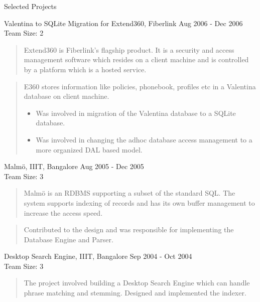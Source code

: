 \documentclass{resume}
\newcommand{\teamsize}{\\\sc\footnotesize Team Size: }
\begin{document}
\begin{category}{Selected Projects}{}
    \item {\topic Valentina to SQLite Migration for Extend360,} Fiberlink
        {\period Aug 2006 - Dec 2006}
        {\teamsize 2}
        \begin{quote}
            Extend360 is Fiberlink's flagship product. It is a security and
            access management software which resides on a client machine and is
            controlled by a platform which is a hosted service.
        \end{quote}
        \begin{quote}
            E360 stores information like policies, phonebook, profiles etc in a
            Valentina database on client machine.
            \begin{itemize}
                \item Was involved in migration of the Valentina database to a
                    SQLite database.
                \item Was involved in changing the adhoc database access management
                    to a more organized DAL based model.
            \end{itemize}
        \end{quote}

    \item {\topic Malm\"o,} IIIT, Bangalore
        {\period Aug 2005 - Dec 2005}
        {\teamsize 3}
        \begin{quote}
            Malm\"o is an RDBMS supporting a subset of the standard SQL. The
            system supports indexing of records and has its own buffer
            management to increase the access speed.
        \end{quote}
        \begin{quote}
            Contributed to the design and was responsible for implementing the
            Database Engine and Parser.
         \end{quote}

    \item {\topic Desktop Search Engine,} IIIT, Bangalore
        {\period Sep 2004 - Oct 2004}
        {\teamsize 3}
        \begin{quote}
            The project involved building a Desktop Search Engine which can
            handle phrase matching and stemming. Designed and implemented the
            indexer.
        \end{quote}

\end{category}
\end{document}

